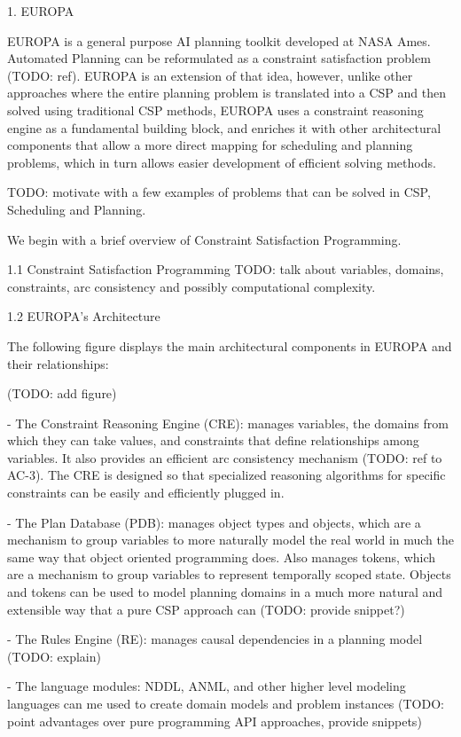 1. EUROPA

EUROPA is a general purpose AI planning toolkit developed at NASA Ames.  Automated Planning can be reformulated as a constraint satisfaction problem (TODO: ref). EUROPA is an extension of that idea, however, unlike other approaches where the entire planning problem is translated into a CSP and then solved using traditional CSP methods, EUROPA uses a constraint reasoning engine as a fundamental building block, and enriches it with other architectural components that allow a more direct mapping for scheduling and planning problems, which in turn allows easier development of efficient solving methods. 

TODO: motivate with a few examples of problems that can be solved in CSP, Scheduling and Planning.

We begin with a brief overview of Constraint Satisfaction Programming.

1.1 Constraint Satisfaction Programming
TODO: talk about variables, domains, constraints, arc consistency and possibly computational complexity.


1.2 EUROPA's Architecture

The following figure displays the main architectural components in EUROPA and their relationships:

(TODO: add figure)

- The Constraint Reasoning Engine (CRE): manages variables, the domains from which they can take values, and constraints that define relationships among variables. It also provides an efficient arc consistency mechanism (TODO: ref to AC-3). The CRE is designed so that specialized reasoning algorithms for specific constraints can be easily and efficiently plugged in.

- The Plan Database (PDB): manages object types and objects, which are a mechanism to group variables to more naturally model the real world in much the same way that object oriented programming does. Also manages tokens, which are a mechanism to group variables to represent temporally scoped state. Objects and tokens can be used to model planning domains in a much more natural and extensible way that a pure CSP approach can (TODO: provide snippet?)

- The Rules Engine (RE): manages causal dependencies in a planning model (TODO: explain)

- The language modules: NDDL, ANML, and other higher level modeling languages can me used to create domain models and problem instances (TODO: point advantages over pure programming API approaches, provide snippets)

